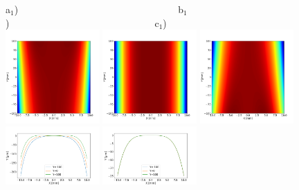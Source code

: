 \documentclass{iucr}              %
\begin{document}
\begin{figure}\label{fig:detrended}
\flushleft
a$_1$)~~~~~~~~~~~~~~~~~~~~~~~~~~~~~~~~~b$_1$)~~~~~~~~~~~~~~~~~~~~~~~~~~~~~~c$_1$)\\
\centering
\includegraphics[width=0.32\textwidth]{figures/diaboloid_detrended_1:5_image.png} 
\includegraphics[width=0.32\textwidth]{figures/diaboloid_detrended_1:2_image.png} 
\includegraphics[width=0.32\textwidth]{figures/diaboloid_detrended_1:1_image.png} \\
\includegraphics[width=0.32\textwidth]{figures/diaboloid_detrended_1:5_profile.png}
\includegraphics[width=0.32\textwidth]{figures/diaboloid_detrended_1:2_profile.png}

\end{figure}
\end{document}
